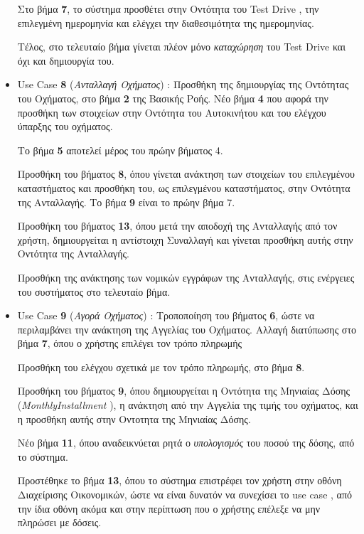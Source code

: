 \documentclass{../ol-softwaremanual}
\begin{document}
\begin{itemize}
		Στο βήμα \textbf{7}, το σύστημα προσθέτει στην Οντότητα του \en Test Drive \gr, την επιλεγμένη ημερομηνία και ελέγχει την διαθεσιμότητα της ημερομηνίας.
		
		Τέλος, στο τελευταίο βήμα γίνεται πλέον μόνο \textit{καταχώρηση} του \en Test Drive \gr και όχι και δημιουργία του.
		
		\item \en Use Case \textbf{8} \gr (\textit{Ανταλλαγή Οχήματος}) : Προσθήκη της δημιουργίας της Οντότητας του Οχήματος, στο βήμα \textbf{2} της Βασικής Ροής. Νέο βήμα \textbf{4} που αφορά την προσθήκη των στοιχείων στην Οντότητα του Αυτοκινήτου και του ελέγχου ύπαρξης του οχήματος. 
		
		Το βήμα \textbf{5} αποτελεί μέρος του πρώην βήματος 4.
		
		Προσθήκη του βήματος \textbf{8}, όπου γίνεται ανάκτηση των στοιχείων του επιλεγμένου καταστήματος και προσθήκη του, ως επιλεγμένου καταστήματος, στην Οντότητα της Ανταλλαγής. Το βήμα \textbf{9} είναι το πρώην βήμα 7.
		
		Προσθήκη του βήματος \textbf{13}, όπου μετά την αποδοχή της Ανταλλαγής από τον χρήστη, δημιουργείται η αντίστοιχη Συναλλαγή και γίνεται προσθήκη αυτής στην Οντότητα της Ανταλλαγής.
		
		Προσθήκη της  ανάκτησης των νομικών εγγράφων της Ανταλλαγής, στις ενέργειες του συστήματος στο τελευταίο βήμα.
		
		\item \en Use Case \textbf{9} \gr (\textit{Αγορά Οχήματος}) : Τροποποίηση του βήματος \textbf{6}, ώστε να περιλαμβάνει την ανάκτηση της Αγγελίας του Οχήματος. Αλλαγή διατύπωσης στο βήμα \textbf{7}, όπου ο χρήστης επιλέγει τον τρόπο πληρωμής
		
		Προσθήκη του ελέγχου σχετικά με τον τρόπο πληρωμής, στο βήμα \textbf{8}.
		
		Προσθήκη του βήματος \textbf{9}, όπου δημιουργείται η Οντότητα της Μηνιαίας Δόσης (\en  \textit{MonthlyInstallment} \gr), η ανάκτηση από την Αγγελία της τιμής του οχήματος, και η προσθήκη αυτής στην Οντοτητα της Μηνιαίας Δόσης.
		
		Νέο βήμα \textbf{11}, όπου αναδεικνύεται ρητά ο \textit{υπολογισμός} του ποσού της δόσης, από το σύστημα.
		
		Προστέθηκε το βήμα \textbf{13}, όπου το σύστημα επιστρέφει τον χρήστη στην οθόνη Διαχείρισης Οικονομικών, ώστε να είναι δυνατόν να συνεχίσει το \en use case \gr, από την ίδια οθόνη ακόμα και στην περίπτωση που ο χρήστης επέλεξε να μην πληρώσει με δόσεις.
		

\end{itemize}
\end{document}
